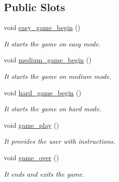 \subsection*{Public Slots}
\begin{DoxyCompactItemize}
\item 
\hypertarget{class_main_window_a8cb2a71b4571b250bba40178f58b065c}{}void \hyperlink{class_main_window_a8cb2a71b4571b250bba40178f58b065c}{easy\+\_\+game\+\_\+begin} ()\label{class_main_window_a8cb2a71b4571b250bba40178f58b065c}

\begin{DoxyCompactList}\small\item\em It starts the game on easy mode. \end{DoxyCompactList}\item 
void \hyperlink{class_main_window_afefe9454f7bc872888ce48c4efbdc926}{medium\+\_\+game\+\_\+begin} ()
\begin{DoxyCompactList}\small\item\em It starts the game on medium mode. \end{DoxyCompactList}\item 
\hypertarget{class_main_window_a11aed9109e49c6ea802ff6cdd081fb76}{}void \hyperlink{class_main_window_a11aed9109e49c6ea802ff6cdd081fb76}{hard\+\_\+game\+\_\+begin} ()\label{class_main_window_a11aed9109e49c6ea802ff6cdd081fb76}

\begin{DoxyCompactList}\small\item\em It starts the game on hard mode. \end{DoxyCompactList}\item 
void \hyperlink{class_main_window_a6ccf59c9c1c8d6da887106200e675519}{game\+\_\+play} ()
\begin{DoxyCompactList}\small\item\em It provides the user with instructions. \end{DoxyCompactList}\item 
\hypertarget{class_main_window_ad095804e948ea80ebaa1311858700ded}{}void \hyperlink{class_main_window_ad095804e948ea80ebaa1311858700ded}{game\+\_\+over} ()\label{class_main_window_ad095804e948ea80ebaa1311858700ded}

\begin{DoxyCompactList}\small\item\em It ends and exits the game. \end{DoxyCompactList}\end{DoxyCompactItemize}
